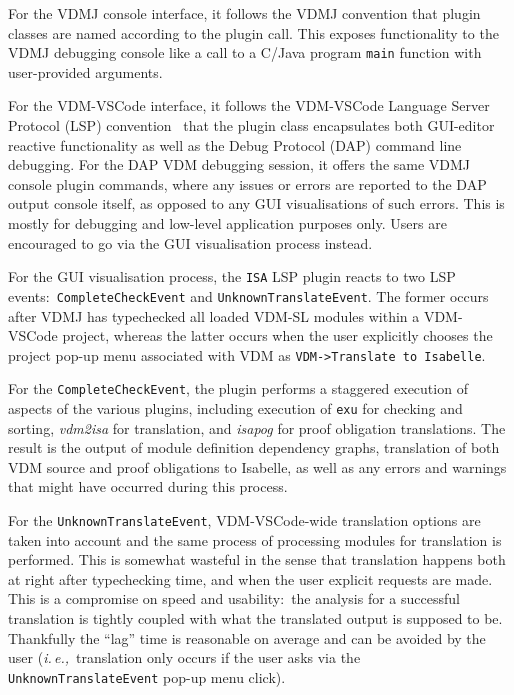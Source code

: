 \documentclass[runningheads,a4paper]{llncs}
\newcommand{\ie}{{\em i.\,e.,\/}}
\begin{document}
For the VDMJ console interface, it follows the VDMJ convention that plugin classes are named according to the plugin call. This exposes functionality to the VDMJ debugging console like a call to a C/Java program \texttt{main} function with user-provided arguments.   

For the VDM-VSCode interface, it follows the VDM-VSCode Language Server Protocol (LSP) convention~\cite{AdvancedVSCodePaper} that the plugin class encapsulates both GUI-editor reactive functionality as well as the Debug Protocol (DAP) command line debugging. For the DAP VDM debugging session, it offers the same VDMJ console plugin commands, where any issues or errors are reported to the DAP output console itself, as opposed to any GUI visualisations of such errors. This is mostly for debugging and low-level application purposes only. Users are encouraged to go via the GUI visualisation process instead. 

For the GUI visualisation process, the \texttt{ISA} LSP plugin reacts to two LSP events:~\texttt{CompleteCheckEvent} and \texttt{UnknownTranslateEvent}. The former occurs after VDMJ has typechecked all loaded VDM-SL modules within a VDM-VSCode project, whereas the latter occurs when the user explicitly chooses the project pop-up menu associated with VDM as {\verb'VDM->Translate to Isabelle'}. 

For the \texttt{CompleteCheckEvent}, the plugin performs a staggered execution of aspects of the various plugins, including execution of \texttt{exu} for checking and sorting, \textit{vdm2isa} for translation, and \textit{isapog} for proof obligation translations. The result is the output of module definition dependency graphs, translation of both VDM source and proof obligations to Isabelle, as well as any errors and warnings that might have occurred during this process. 

For the \texttt{UnknownTranslateEvent}, VDM-VSCode-wide translation options are taken into account and the same process of processing modules for translation is performed. This is somewhat wasteful in the sense that translation happens both at right after typechecking time, and when the user explicit requests are made. This is a compromise on speed and usability:~the analysis for a successful translation is tightly coupled with what the translated output is supposed to be. Thankfully the ``lag'' time is reasonable on average and can be avoided by the user (\ie~translation only occurs if the user asks via the \texttt{UnknownTranslateEvent} pop-up menu click). 
\end{document}
